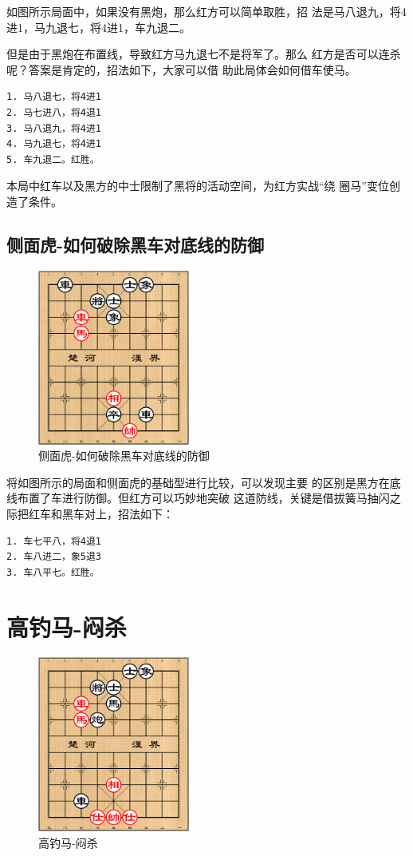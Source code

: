 \documentclass[a5paper,twoside]{book}
\begin{document}
如图所示局面中，如果没有黑炮，那么红方可以简单取胜，招
法是马八退九，将4进1，马九退七，将4进1，车九退二。

但是由于黑炮在布置线，导致红方马九退七不是将军了。那么
红方是否可以连杀呢？答案是肯定的，招法如下，大家可以借
助此局体会如何借车使马。

\begin{verbatim}
1. 马八退七，将4进1
2. 马七进八，将4退1
3. 马八退九，将4进1
4. 马九退七，将4进1
5. 车九退二。红胜。
\end{verbatim}

本局中红车以及黑方的中士限制了黑将的活动空间，为红方实战“绕
圈马”变位创造了条件。

\subsection{侧面虎-如何破除黑车对底线的防御}
\label{sec-4-3-4}
\begin{figure}[H]
\centering
\includegraphics[width=5cm]{pic/侧面虎-如何破除黑车对底线的防御.png}
\caption{侧面虎-如何破除黑车对底线的防御}
\end{figure}


将如图所示的局面和侧面虎的基础型进行比较，可以发现主要
的区别是黑方在底线布置了车进行防御。但红方可以巧妙地突破
这道防线，关键是借拔簧马抽闪之际把红车和黑车对上，招法如下：

\begin{verbatim}
1. 车七平八，将4退1
2. 车八进二，象5退3
3. 车八平七。红胜。
\end{verbatim}

\section{高钓马-闷杀}
\label{sec-4-4}
\begin{figure}[H]
\centering
\includegraphics[width=5cm]{pic/高钓马-闷杀.png}
\caption{高钓马-闷杀}
\end{figure}
\end{document}
